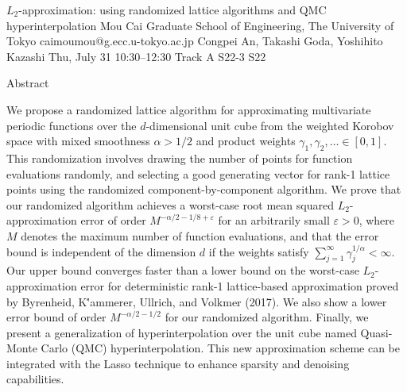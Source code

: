 \begin{talk}
  {$L_2$-approximation: using randomized lattice algorithms and QMC hyperinterpolation}%
  {Mou Cai}%
  {Graduate School of Engineering, The University of Tokyo}%
  {caimoumou@g.ecc.u-tokyo.ac.jp}%
  {Congpei An, Takashi Goda, Yoshihito Kazashi}%
  {}%
  {Thu, July 31 10:30–12:30 Track A}%
  {S22-3}%
  {S22}%
  
				
Abstract

			
We propose a randomized lattice algorithm for approximating multivariate periodic functions over the $d$-dimensional unit cube from the weighted Korobov space with mixed smoothness $\alpha > 1/2$ and product weights $\gamma_1,\gamma_2,\ldots\in [0,1]$. This randomization involves drawing the number of points for function evaluations randomly, and selecting a good generating vector for rank-1 lattice points using the randomized component-by-component algorithm. We prove that our randomized algorithm achieves a worst-case root mean squared $L_2$-approximation error of order $M^{-\alpha/2 - 1/8 + \varepsilon}$ for an arbitrarily small $\varepsilon > 0$, where $M$ denotes the maximum number of function evaluations, and that the error bound is independent of the dimension $d$ if the weights satisfy $\sum_{j=1}^\infty \gamma_j^{1/\alpha} < \infty$. Our upper bound converges faster than a lower bound on the worst-case $L_2$-approximation error for deterministic rank-1 lattice-based approximation proved by Byrenheid, K\''{a}mmerer, Ullrich, and Volkmer (2017). We also show a lower error bound of order $M^{-\alpha/2-1/2}$ for our randomized algorithm. Finally, we present a generalization of hyperinterpolation over the unit cube named Quasi-Monte Carlo (QMC) hyperinterpolation. This new approximation scheme can be integrated with the Lasso technique to enhance sparsity and denoising capabilities.

\medskip


\end{talk}

